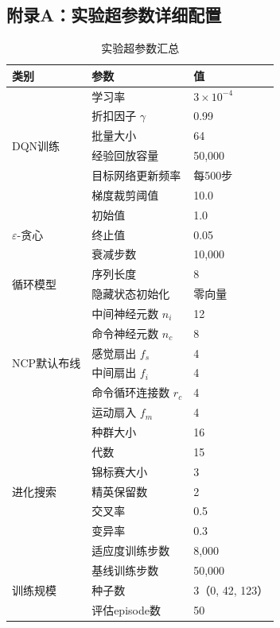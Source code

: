 \xiaosi

\subsection*{附录A：实验超参数详细配置}

\wuhao
\begin{table}[H]
  \centering
  \caption{实验超参数汇总}
  \label{tab:hyperparams}
  \begin{tabular}{lll}
    \hline
    类别 & 参数 & 值 \\
    \hline
    \multirow{6}{*}{DQN训练} & 学习率 & $3 \times 10^{-4}$ \\
    & 折扣因子 $\gamma$ & 0.99 \\
    & 批量大小 & 64 \\
    & 经验回放容量 & 50,000 \\
    & 目标网络更新频率 & 每500步 \\
    & 梯度裁剪阈值 & 10.0 \\
    \hline
    \multirow{3}{*}{$\varepsilon$-贪心} & 初始值 & 1.0 \\
    & 终止值 & 0.05 \\
    & 衰减步数 & 10,000 \\
    \hline
    \multirow{2}{*}{循环模型} & 序列长度 & 8 \\
    & 隐藏状态初始化 & 零向量 \\
    \hline
    \multirow{6}{*}{NCP默认布线} & 中间神经元数 $n_i$ & 12 \\
    & 命令神经元数 $n_c$ & 8 \\
    & 感觉扇出 $f_s$ & 4 \\
    & 中间扇出 $f_i$ & 4 \\
    & 命令循环连接数 $r_c$ & 4 \\
    & 运动扇入 $f_m$ & 4 \\
    \hline
    \multirow{7}{*}{进化搜索} & 种群大小 & 16 \\
    & 代数 & 15 \\
    & 锦标赛大小 & 3 \\
    & 精英保留数 & 2 \\
    & 交叉率 & 0.5 \\
    & 变异率 & 0.3 \\
    & 适应度训练步数 & 8,000 \\
    \hline
    \multirow{3}{*}{训练规模} & 基线训练步数 & 50,000 \\
    & 种子数 & 3（0, 42, 123）\\
    & 评估episode数 & 50 \\
    \hline
  \end{tabular}
\end{table}

